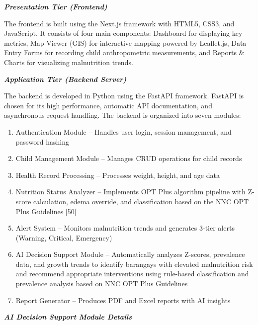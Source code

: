 \documentclass[12pt, a4paper]{report}
\begin{document}
\noindent \textbf{\textit{Presentation Tier (Frontend)}}

The frontend is built using the Next.js framework with HTML5, CSS3, and JavaScript. It consists of four main components: Dashboard for displaying key metrics, Map Viewer (GIS) for interactive mapping powered by Leaflet.js, Data Entry Forms for recording child anthropometric measurements, and Reports \& Charts for visualizing malnutrition trends.

\noindent \textbf{\textit{Application Tier (Backend Server)}}

The backend is developed in Python using the FastAPI framework. FastAPI is chosen for its high performance, automatic API documentation, and asynchronous request handling. The backend is organized into seven modules:

\begin{enumerate}
    \item Authentication Module -- Handles user login, session management, and password hashing
    \item Child Management Module -- Manages CRUD operations for child records
    \item Health Record Processing -- Processes weight, height, and age data
    \item Nutrition Status Analyzer -- Implements OPT Plus algorithm pipeline with Z-score calculation, edema override, and classification based on the NNC OPT Plus Guidelines [50]
    \item Alert System -- Monitors malnutrition trends and generates 3-tier alerts (Warning, Critical, Emergency)
    \item AI Decision Support Module -- Automatically analyzes Z-scores, prevalence data, and growth trends to identify barangays with elevated malnutrition risk and recommend appropriate interventions using rule-based classification and prevalence analysis based on NNC OPT Plus Guidelines
    \item Report Generator -- Produces PDF and Excel reports with AI insights
\end{enumerate}

\noindent \textbf{\textit{AI Decision Support Module Details}}
\end{document}
